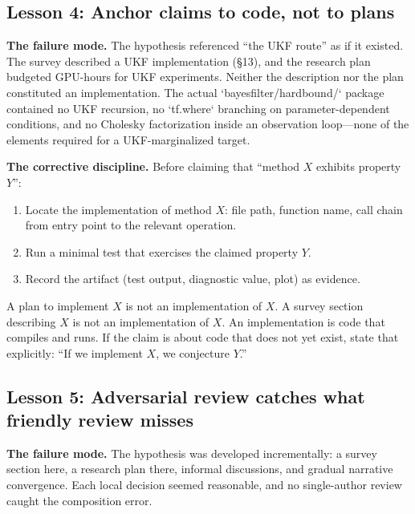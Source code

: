 \subsection{Lesson 4: Anchor claims to code, not to plans}

\textbf{The failure mode.} The hypothesis referenced ``the UKF route'' as if it existed. The survey described a UKF implementation (§13), and the research plan budgeted GPU-hours for UKF experiments. Neither the description nor the plan constituted an implementation. The actual `bayesfilter/hardbound/` package contained no UKF recursion, no `tf.where` branching on parameter-dependent conditions, and no Cholesky factorization inside an observation loop—none of the elements required for a UKF-marginalized target.

\textbf{The corrective discipline.} Before claiming that ``method $X$ exhibits property $Y$'':
\begin{enumerate}
\item Locate the implementation of method $X$: file path, function name, call chain from entry point to the relevant operation.
\item Run a minimal test that exercises the claimed property $Y$.
\item Record the artifact (test output, diagnostic value, plot) as evidence.
\end{enumerate}

A plan to implement $X$ is not an implementation of $X$. A survey section describing $X$ is not an implementation of $X$. An implementation is code that compiles and runs. If the claim is about code that does not yet exist, state that explicitly: ``If we implement $X$, we conjecture $Y$.''

\subsection{Lesson 5: Adversarial review catches what friendly review misses}

\textbf{The failure mode.} The hypothesis was developed incrementally: a survey section here, a research plan there, informal discussions, and gradual narrative convergence. Each local decision seemed reasonable, and no single-author review caught the composition error.

